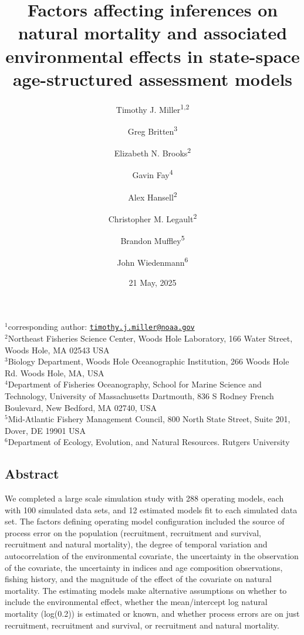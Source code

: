 \documentclass[
  12pt,
]{article}
\title{Factors affecting inferences on natural mortality and associated environmental effects in state-space age-structured assessment models}
\author{Timothy J. Miller\textsuperscript{1,2} \and Greg Britten\textsuperscript{3} \and Elizabeth N. Brooks\textsuperscript{2} \and Gavin Fay\textsuperscript{4} \and Alex Hansell\textsuperscript{2} \and Christopher M. Legault\textsuperscript{2} \and Brandon Muffley\textsuperscript{5} \and John Wiedenmann\textsuperscript{6}}
\date{21 May, 2025}
\begin{document}
\maketitle

\(^1\)corresponding author: \href{mailto:timothy.j.miller@noaa.gov}{\nolinkurl{timothy.j.miller@noaa.gov}}\\
\(^2\)Northeast Fisheries Science Center, Woods Hole Laboratory, 166 Water Street, Woods Hole, MA 02543 USA\\
\(^3\)Biology Department, Woods Hole Oceanographic Institution, 266 Woods Hole Rd. Woods Hole, MA, USA\\
\(^4\)Department of Fisheries Oceanography, School for Marine Science and Technology, University of Massachusetts Dartmouth, 836 S Rodney French Boulevard, New Bedford, MA 02740, USA\\
\(^5\)Mid-Atlantic Fishery Management Council, 800 North State Street, Suite 201, Dover, DE 19901 USA\\
\(^6\)Department of Ecology, Evolution, and Natural Resources. Rutgers University\\

\pagebreak

\hypertarget{abstract}{%
\subsection*{Abstract}\label{abstract}}

We completed a large scale simulation study with 288 operating models, each with 100 simulated data sets, and 12 estimated models fit to each simulated data set. The factors defining operating model configuration included the source of process error on the population (recruitment, recruitment and survival, recruitment and natural mortality), the degree of temporal variation and autocorrelation of the environmental covariate, the uncertainty in the observation of the covariate, the uncertainty in indices and age composition observations, fishing history, and the magnitude of the effect of the covariate on natural mortality. The estimating models make alternative assumptions on whether to include the environmental effect, whether the mean/intercept log natural mortality (log(0.2)) is estimated or known, and whether process errors are on just recruitment, recruitment and survival, or recruitment and natural mortality.
\end{document}
